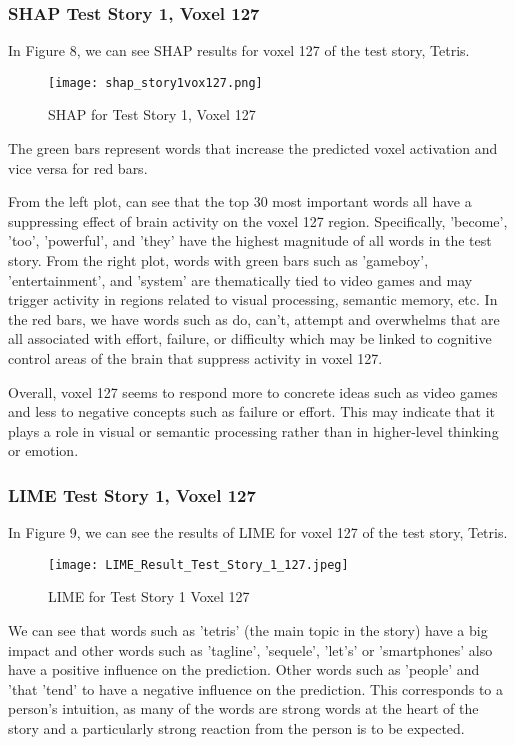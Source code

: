 \documentclass[12pt,letterpaper]{article}
\begin{document}
\subsubsection{SHAP Test Story 1, Voxel 127}

In Figure 8, we can see SHAP results for voxel 127 of the test story, Tetris. 

\begin{figure}[H]
    \centering
    \texttt{[image: shap\_story1vox127.png]}
    \caption{SHAP for Test Story 1, Voxel 127}
    \label{fig:enter-label}
\end{figure}

The green bars represent words that increase the predicted voxel activation and vice versa for red bars.  

From the left plot, can see that the top 30 most important words all have a suppressing effect of brain activity on the voxel 127 region. Specifically, 'become', 'too', 'powerful', and 'they' have the highest magnitude of all words in the test story. From the right plot, words with green bars such as 'gameboy', 'entertainment', and 'system' are thematically tied to video games and may trigger activity in regions related to visual processing, semantic memory, etc. In the red bars, we have words such as do, can't, attempt and overwhelms that are all associated with effort, failure, or difficulty which may be linked to cognitive control areas of the brain that suppress activity in voxel 127. 

Overall, voxel 127 seems to respond more to concrete ideas such as video games and less to negative concepts such as failure or effort. This may indicate that it plays a role in visual or semantic processing rather than in higher-level thinking or emotion. 

\subsubsection{LIME Test Story 1, Voxel 127}
In Figure 9, we can see the results of LIME for voxel 127 of the test story, Tetris.

\begin{figure}[H]
  \centering
  \texttt{[image: LIME\_Result\_Test\_Story\_1\_127.jpeg]}
  \caption{LIME for Test Story 1 Voxel 127}
  \label{fig:LIME1}
\end{figure}

We can see that words such as 'tetris' (the main topic in the story) have a big impact and other words such as 'tagline', 'sequele', 'let's' or 'smartphones' also have a positive influence on the prediction. Other words such as 'people' and 'that 'tend' to have a negative influence on the prediction. This corresponds to a person's intuition, as many of the words are strong words at the heart of the story and a particularly strong reaction from the person is to be expected.
\end{document}
